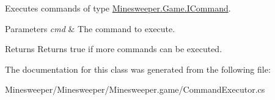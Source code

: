 Executes commands of type \hyperlink{interface_minesweeper_1_1_game_1_1_i_command}{Minesweeper.\+Game.\+I\+Command}. 


\begin{DoxyParams}{Parameters}
{\em cmd} & The command to execute.\\
\hline
\end{DoxyParams}
\begin{DoxyReturn}{Returns}
Returns true if more commands can be executed.
\end{DoxyReturn}


The documentation for this class was generated from the following file\+:\begin{DoxyCompactItemize}
\item 
Minesweeper/\+Minesweeper/\+Minesweeper.\+game/Command\+Executor.\+cs\end{DoxyCompactItemize}
